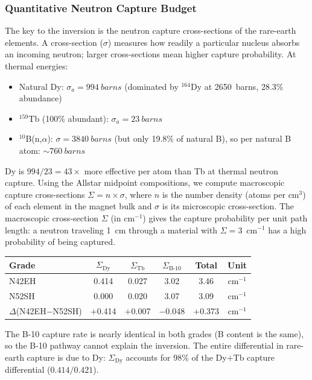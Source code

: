 \documentclass[11pt,letterpaper]{article}
\begin{document}
\subsubsection{Quantitative Neutron Capture Budget}

The key to the inversion is the neutron capture cross-sections of the
rare-earth elements. A cross-section ($\sigma$) measures how readily a
particular nucleus absorbs an incoming neutron; larger cross-sections mean
higher capture probability. At thermal energies:
\begin{itemize}
    \item Natural Dy: $\sigma_a = \SI{994}{barns}$ (dominated by
    ${}^{164}$Dy at \SI{2650}{barns}, 28.3\% abundance)
    \item ${}^{159}$Tb (100\% abundant): $\sigma_a = \SI{23}{barns}$
    \item ${}^{10}$B(n,$\alpha$): $\sigma = \SI{3840}{barns}$ (but only
    19.8\% of natural B), so per natural B atom: $\sim\SI{760}{barns}$
\end{itemize}

Dy is $994/23 = 43\times$ more effective per atom than Tb at thermal neutron
capture. Using the Allstar midpoint compositions, we compute macroscopic
capture cross-sections $\Sigma = n \times \sigma$, where $n$ is the number
density (atoms per cm$^3$) of each element in the magnet bulk and $\sigma$ is
its microscopic cross-section. The macroscopic cross-section $\Sigma$ (in
cm$^{-1}$) gives the capture probability per unit path length: a neutron
traveling \SI{1}{cm} through a material with $\Sigma = 3$~cm$^{-1}$ has a high
probability of being captured.

\begin{center}
\begin{tabular}{lccccc}
\toprule
Grade  & $\Sigma_\mathrm{Dy}$ & $\Sigma_\mathrm{Tb}$ & $\Sigma_\mathrm{B\text{-}10}$ & Total & Unit \\
\midrule
N42EH  & 0.414  & 0.027  & 3.02  & 3.46  & cm$^{-1}$ \\
N52SH  & 0.000  & 0.020  & 3.07  & 3.09  & cm$^{-1}$ \\
\midrule
$\Delta$(N42EH$-$N52SH) & $+$0.414 & $+$0.007 & $-$0.048 & $+$0.373 & cm$^{-1}$ \\
\bottomrule
\end{tabular}
\end{center}

The B-10 capture rate is nearly identical in both grades (B content is the
same), so the B-10 pathway cannot explain the inversion. The entire
differential in rare-earth capture is due to Dy: $\Sigma_\mathrm{Dy}$
accounts for 98\% of the Dy$+$Tb capture differential ($0.414/0.421$).
\end{document}
